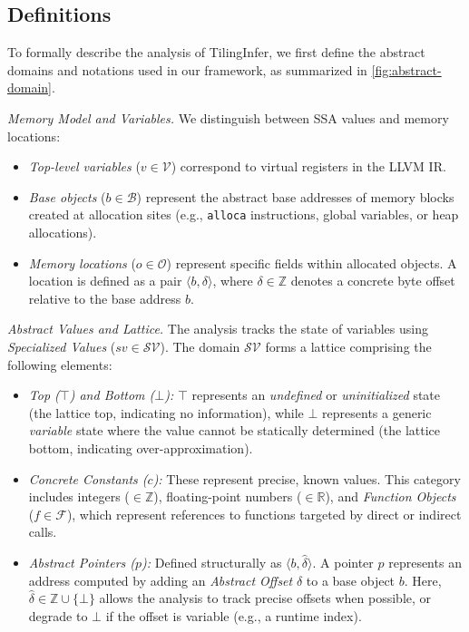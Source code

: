 \documentclass[manuscript,screen,review]{acmart}
\theoremstyle{indenteditalic}
\newcommand{\kw}[1]{{\it #1}} %
\begin{document}
\subsection{Definitions}\label{sec:design:definitions}

To formally describe the analysis of TilingInfer, we first define the abstract domains and notations used in our framework, as summarized in \autoref{fig:abstract-domain}.

\textit{Memory Model and Variables.}
We distinguish between SSA values and memory locations:
\begin{itemize}
	\item \kw{Top-level variables} ($v \in \mathcal{V}$) correspond to virtual registers in the LLVM IR.
	\item \kw{Base objects} ($b \in \mathcal{B}$) represent the abstract base addresses of memory blocks created at allocation sites (e.g., \texttt{alloca} instructions, global variables, or heap allocations).
	\item \kw{Memory locations} ($o \in \mathcal{O}$) represent specific fields within allocated objects. A location is defined as a pair $\langle b, \delta \rangle$, where $\delta \in \mathbb{Z}$ denotes a concrete byte offset relative to the base address $b$.
\end{itemize}

\textit{Abstract Values and Lattice.}
The analysis tracks the state of variables using \kw{Specialized Values} ($sv \in \mathcal{SV}$). The domain $\mathcal{SV}$ forms a lattice comprising the following elements:
\begin{itemize}
	\item \kw{Top ($\top$) and Bottom ($\bot$):} $\top$ represents an \textit{undefined} or \textit{uninitialized} state (the lattice top, indicating no information), while $\bot$ represents a generic \textit{variable} state where the value cannot be statically determined (the lattice bottom, indicating over-approximation).
	\item \kw{Concrete Constants ($c$):} These represent precise, known values. This category includes integers ($\in \mathbb{Z}$), floating-point numbers ($\in \mathbb{R}$), and \kw{Function Objects} ($f \in \mathcal{F}$), which represent references to functions targeted by direct or indirect calls.
	\item \kw{Abstract Pointers ($p$):} Defined structurally as $\langle b, \hat{\delta} \rangle$. A pointer $p$ represents an address computed by adding an \kw{Abstract Offset} $\hat{\delta}$ to a base object $b$. Here, $\hat{\delta} \in \mathbb{Z} \cup \{\bot\}$ allows the analysis to track precise offsets when possible, or degrade to $\bot$ if the offset is variable (e.g., a runtime index).
\end{itemize}
\end{document}
